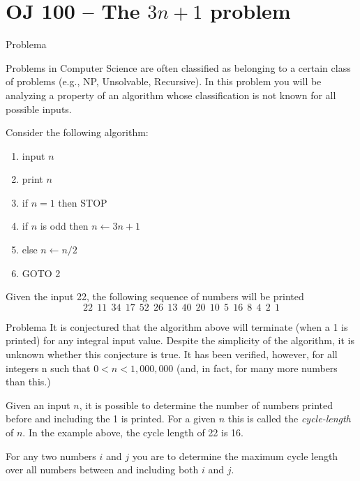 \section{OJ 100 -- The $3n + 1$ problem}

\begin{frame}[fragile]{Problema}

Problems in Computer Science are often classified as belonging to a certain class of problems (e.g.,
NP, Unsolvable, Recursive). In this problem you will be analyzing a property of an algorithm whose
classification is not known for all possible inputs.

Consider the following algorithm:

\begin{enumerate}
\item input $n$
\item print $n$
\item if $n = 1$ then STOP
\item if $n$ is odd then $n \leftarrow 3n + 1$
\item else $n \leftarrow n/2$
\item GOTO 2
\end{enumerate}

Given the input 22, the following sequence of numbers will be printed
\[
22\ \ 11\ \ 34\ \ 17\ \ 52\ \ 26\ \ 13\ \ 40\ \ 20\ \ 10\ \ 5\ \ 16\ \ 8\ \ 4\ \ 2\ \ 1
\]
\end{frame}

\begin{frame}[fragile]{Problema}
It is conjectured that the algorithm above will terminate (when a 1 is printed) for any integral input
value. Despite the simplicity of the algorithm, it is unknown whether this conjecture is true. It has
been verified, however, for all integers n such that $0 < n < 1,000,000$ (and, in fact, for many more
numbers than this.)

Given an input $n$, it is possible to determine the number of numbers printed before and including
the 1 is printed. For a given $n$ this is called the \textit{cycle-length} of $n$. In the example above, the cycle
length of 22 is 16.

For any two numbers $i$ and $j$ you are to determine the maximum cycle length over all numbers
between and including both $i$ and $j$.
\end{frame}

